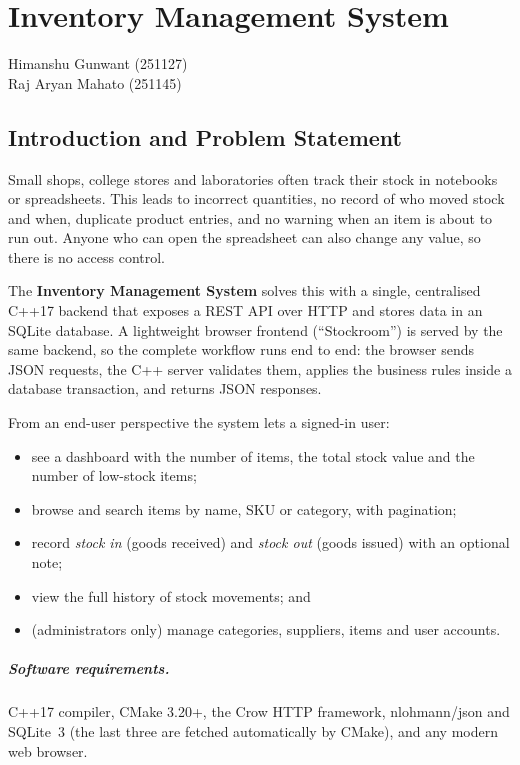 \documentclass[12pt,a4paper,oneside]{book}
\makeatletter
\newcommand{\chapterauthor}[1]{%
  {\parindent0pt\vspace*{-15pt}%
  \linespread{1.1}\large\itshape\begin{flushright}#1\end{flushright}%
  \par\nobreak\vspace*{25pt}}
  \@afterheading%
}
\makeatother
\begin{document}
\mainmatter


\chapter{Inventory Management System}
\chapterauthor{Himanshu Gunwant (251127) \\ Raj Aryan Mahato (251145)}

\section{Introduction and Problem Statement}
Small shops, college stores and laboratories often track their stock in notebooks or
spreadsheets. This leads to incorrect quantities, no record of who moved stock and when,
duplicate product entries, and no warning when an item is about to run out. Anyone who can
open the spreadsheet can also change any value, so there is no access control.

The \textbf{Inventory Management System} solves this with a single, centralised C++17
backend that exposes a REST API over HTTP and stores data in an SQLite database. A
lightweight browser frontend (``Stockroom'') is served by the same backend, so the complete
workflow runs end to end: the browser sends JSON requests, the C++ server validates them,
applies the business rules inside a database transaction, and returns JSON responses.

From an end-user perspective the system lets a signed-in user:
\begin{itemize}
    \item see a dashboard with the number of items, the total stock value and the number of low-stock items;
    \item browse and search items by name, SKU or category, with pagination;
    \item record \emph{stock in} (goods received) and \emph{stock out} (goods issued) with an optional note;
    \item view the full history of stock movements; and
    \item (administrators only) manage categories, suppliers, items and user accounts.
\end{itemize}

\paragraph{Software requirements.} C++17 compiler, CMake 3.20+, the Crow HTTP framework,
nlohmann/json and SQLite~3 (the last three are fetched automatically by CMake), and any
modern web browser.
\end{document}
